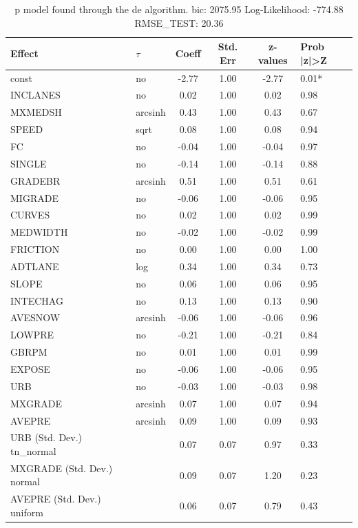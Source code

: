 \begin{table}
	\caption{p model found through the de algorithm. bic: 2075.95 Log-Likelihood: -774.88 RMSE_TEST: 20.36}
	\begin{center}
		\begin{tabular}{|l|l|c|c|c|l|}
			\hline
			Effect & $\tau$ & Coeff & Std. Err & z-values & Prob |z|>Z \\
			\hline
			const & no & -2.77 & 1.00 & -2.77 & 0.01* \\
			\hline
			INCLANES & no & 0.02 & 1.00 & 0.02 & 0.98 \\
			\hline
			MXMEDSH & arcsinh & 0.43 & 1.00 & 0.43 & 0.67 \\
			\hline
			SPEED & sqrt & 0.08 & 1.00 & 0.08 & 0.94 \\
			\hline
			FC & no & -0.04 & 1.00 & -0.04 & 0.97 \\
			\hline
			SINGLE & no & -0.14 & 1.00 & -0.14 & 0.88 \\
			\hline
			GRADEBR & arcsinh & 0.51 & 1.00 & 0.51 & 0.61 \\
			\hline
			MIGRADE & no & -0.06 & 1.00 & -0.06 & 0.95 \\
			\hline
			CURVES & no & 0.02 & 1.00 & 0.02 & 0.99 \\
			\hline
			MEDWIDTH & no & -0.02 & 1.00 & -0.02 & 0.99 \\
			\hline
			FRICTION & no & 0.00 & 1.00 & 0.00 & 1.00 \\
			\hline
			ADTLANE & log & 0.34 & 1.00 & 0.34 & 0.73 \\
			\hline
			SLOPE & no & 0.06 & 1.00 & 0.06 & 0.95 \\
			\hline
			INTECHAG & no & 0.13 & 1.00 & 0.13 & 0.90 \\
			\hline
			AVESNOW & arcsinh & -0.06 & 1.00 & -0.06 & 0.96 \\
			\hline
			LOWPRE & no & -0.21 & 1.00 & -0.21 & 0.84 \\
			\hline
			GBRPM & no & 0.01 & 1.00 & 0.01 & 0.99 \\
			\hline
			EXPOSE & no & -0.06 & 1.00 & -0.06 & 0.95 \\
			\hline
			URB & no & -0.03 & 1.00 & -0.03 & 0.98 \\
			\hline
			MXGRADE & arcsinh & 0.07 & 1.00 & 0.07 & 0.94 \\
			\hline
			AVEPRE & arcsinh & 0.09 & 1.00 & 0.09 & 0.93 \\
			\hline
			URB (Std. Dev.) tn_normal &  & 0.07 & 0.07 & 0.97 & 0.33 \\
			\hline
			MXGRADE (Std. Dev.) normal &  & 0.09 & 0.07 & 1.20 & 0.23 \\
			\hline
			AVEPRE (Std. Dev.) uniform &  & 0.06 & 0.07 & 0.79 & 0.43 \\
			\hline
		\end{tabular}
	\end{center}
\end{table}
